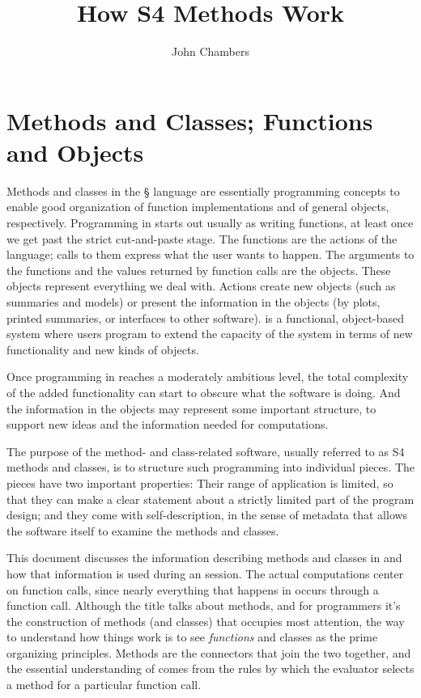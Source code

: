 \documentclass[11pt]{article}
\title{How S4 Methods Work}
\author{John Chambers}
\newif\ifpdf
\begin{document}
\ifpdf
\DeclareGraphicsExtensions{.pdf, .jpg, .tif}
\else
{}
\fi

\maketitle

\section{Methods and Classes; Functions and Objects}
\label{sec:meth-clas-funct}

Methods and classes in the \S{} language are essentially programming concepts to enable good organization  of function implementations and of general objects, respectively.
Programming in \R{} starts out usually as writing functions, at least once we get past the strict cut-and-paste stage.
The functions are the actions of the language; calls to them express what the user wants to happen.
The arguments to the functions and the values returned by function calls are the objects.
These objects represent everything we deal with.
Actions create new objects (such as summaries and models) or present the information in the objects (by plots, printed summaries, or interfaces to other software).
\R{} is a functional, object-based system where users program to extend the capacity of the system in terms of new functionality and new kinds of objects.

Once programming in \R{} reaches a moderately ambitious level, the total complexity of the added functionality can start to obscure what the software is doing.
And the information in the objects may represent some important structure, to support new ideas and the information needed for computations.

The purpose of the method- and class-related software, usually referred to as S4 methods and classes, is to structure such programming into individual pieces.
The pieces have two important properties:  Their range of application is limited, so that they can make a clear statement about a strictly limited part of the program design; and they come with self-description, in the sense of metadata that allows the software itself to examine the methods and classes.

This document discusses the information describing methods and classes in \R{} and how that information is used during an \R{} session.
The actual computations center on function calls, since nearly everything that happens in \R{} occurs through a function call.
Although the title talks about methods, and for programmers it's the construction of methods (and classes) that occupies most attention, the way to understand how things work is to see \emph{functions} and classes as the prime organizing principles.
Methods are the connectors that join the two together, and the essential understanding of  comes from the rules by which the \R{} evaluator selects a method for a particular function call.
\end{document}
